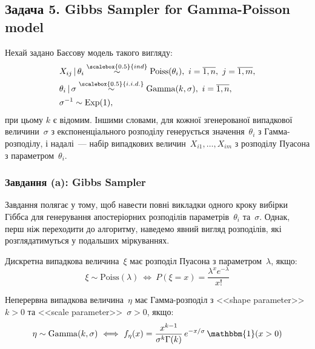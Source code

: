 \subsection*{Задача 5. Gibbs Sampler for Gamma-Poisson model}

\setcounter{subsection}{5}
\setcounter{equation}{0}

Нехай задано Баєсову модель такого вигляду:
\begin{align}
    & X_{ij} \,|\, \theta_i \overset{\scalebox{0.5}{ind}}{\sim} \mathrm{Poiss}(\theta_i),\ i=\overline{1,n},\ j=\overline{1,m}, \label{task 5 - eq: Bayes model Xij} \\
    & \theta_i \,|\, \sigma \overset{\scalebox{0.5}{i.i.d.}}{\sim} \mathrm{Gamma}(k,\sigma),\ i=\overline{1,n}, \label{task 5 - eq: Bayes model theta} \\
    & \sigma^{-1} \sim \mathrm{Exp}(1), \label{task 5 - eq: Bayes model sigma}
\end{align}
при цьому $k$ є відомим. Іншими словами, для кожної згенерованої випадкової величини~$\sigma$ з експоненціального розподілу генерується значення~$\theta_i$ з Гамма-розподілу, і надалі~--- набір випадкових величин~$X_{i1},\ldots,X_{im}$ з розподілу Пуасона з параметром~$\theta_i$.

\subsubsection*{Завдання (a): Gibbs Sampler}

Завдання полягає у тому, щоб навести повні викладки одного кроку вибірки Гіббса для генерування апостеріорних розподілів параметрів~$\theta_i$ та~$\sigma$. Однак, перш ніж переходити до алгоритму, наведемо явний вигляд розподілів, які розглядатимуться у подальших міркуваннях.  

Дискретна випадкова величина~$\xi$ має розподіл Пуасона з параметром~$\lambda$, якщо: 
\begin{equation}\label{task 5 - eq: dPoisson}
    \xi \sim \mathrm{Poiss}(\lambda) \ \Longleftrightarrow \ P(\xi=x) = \frac{\lambda^{x}e^{-\lambda}}{x!} 
\end{equation}

Неперервна випадкова величина~$\eta$ має Гамма-розподіл з <<shape parameter>> $k>0$ та <<scale parameter>>~$\sigma>0$, якщо:
\begin{equation}\label{task 5 - eq: dGamma}
    \eta \sim \mathrm{Gamma}(k,\sigma) \ \Longleftrightarrow \ f_{\eta}(x) = \frac{x^{k-1}}{\sigma^{k}\Gamma(k)}\, e^{-x/\sigma}\, \mathbbm{1}(x>0)
\end{equation}

